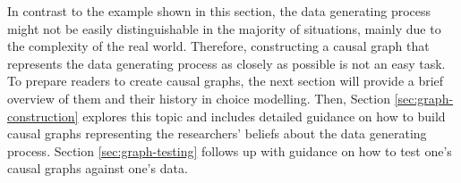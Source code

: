 In contrast to the example shown in this section, the data generating process might not be easily distinguishable in the majority of situations, mainly due to the complexity of the real world.
Therefore, constructing a causal graph that represents the data generating process as closely as possible is not an easy task.
To prepare readers to create causal graphs, the next section will provide a brief overview of them and their history in choice modelling.
Then, Section \ref{sec:graph-construction} explores this topic and includes detailed guidance on how to build causal graphs representing the researchers' beliefs about the data generating process.
Section \ref{sec:graph-testing} follows up with guidance on how to test one's causal graphs against one's data.

